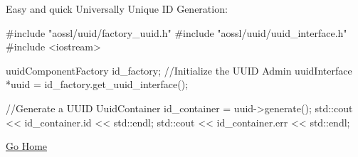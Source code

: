 Easy and quick Universally Unique ID Generation\+: \begin{DoxyVerb}#include "aossl/uuid/factory_uuid.h"
#include "aossl/uuid/uuid_interface.h"
#include <iostream>

uuidComponentFactory id_factory;
//Initialize the UUID Admin
uuidInterface *uuid = id_factory.get_uuid_interface();

//Generate a UUID
UuidContainer id_container = uuid->generate();
std::cout << id_container.id << std::endl;
std::cout << id_container.err << std::endl;
\end{DoxyVerb}


\hyperlink{index}{Go Home} 
